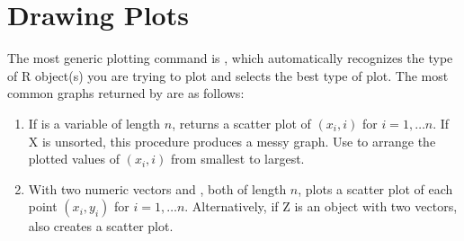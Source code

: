 \documentclass[letterpaper,10pt,english]{sphinxmanual}
\begin{document}
\section{Drawing Plots}
\label{5_graphing_commands:drawing-plots}
The most generic plotting command is , which automatically
recognizes the type of R object(s) you are trying to plot and selects
the best type of plot. The most common graphs returned by  are
as follows:
\begin{enumerate}
\item {} 
If  is a variable of length \(n\),  returns a
scatter plot of \((x_i, i)\) for \(i = 1, \dots n\). If X is
unsorted, this procedure produces a messy graph. Use
 to arrange the plotted values of \((x_i, i)\)
from smallest to largest.

\item {} 
With two numeric vectors  and , both of length \(n\),
 plots a scatter plot of each point \((x_i, y_i)\)
for \(i = 1, \dots n\). Alternatively, if Z is an object with two
vectors,  also creates a scatter plot.

\end{enumerate}
\end{document}
